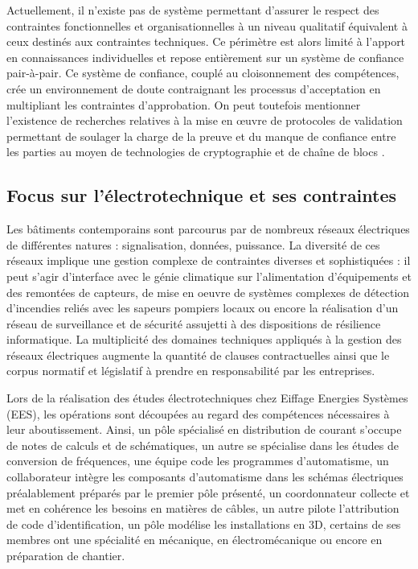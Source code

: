 \documentclass[a4paper,12pt]{article}
\begin{document}
Actuellement, il n'existe pas de système permettant d’assurer le respect des contraintes fonctionnelles et organisationnelles à un niveau qualitatif équivalent à ceux destinés aux contraintes techniques. Ce périmètre est alors limité à l'apport en connaissances individuelles et repose entièrement sur un système de confiance pair-à-pair. Ce système de confiance, couplé au cloisonnement des compétences, crée un environnement de doute contraignant les processus d'acceptation en multipliant les contraintes d’approbation. On peut toutefois mentionner l’existence de recherches relatives à la mise en œuvre de protocoles de validation permettant de soulager la charge de la preuve et du manque de confiance entre les parties au moyen de technologies de cryptographie et de chaîne de blocs \autocite{mathewsBIM+BlockchainSolutionTrust2017a}. 
\subsection{Focus sur l’électrotechnique et ses contraintes}
\label{sec:orgae91d64}
Les bâtiments contemporains sont parcourus par de nombreux réseaux électriques de différentes natures : signalisation, données, puissance. La diversité de ces réseaux implique une gestion complexe de contraintes diverses et sophistiquées : il peut s'agir d'interface avec le génie climatique sur l'alimentation d'équipements et des remontées de capteurs, de mise en oeuvre de systèmes complexes de détection d'incendies reliés avec les sapeurs pompiers locaux ou encore la réalisation d'un réseau de surveillance et de sécurité assujetti à des dispositions de résilience informatique. La multiplicité des domaines techniques appliqués à la gestion des réseaux électriques augmente la quantité de clauses contractuelles ainsi que le corpus normatif et législatif à prendre en responsabilité par les entreprises. 

Lors de la réalisation des études électrotechniques chez Eiffage Energies Systèmes (EES), les opérations sont découpées au regard des compétences nécessaires à leur aboutissement. Ainsi, un pôle spécialisé en distribution de courant s’occupe de notes de calculs et de schématiques, un autre se spécialise dans les études de conversion de fréquences, une équipe code les programmes d’automatisme, un collaborateur intègre les composants d’automatisme dans les schémas électriques préalablement préparés par le premier pôle présenté, un coordonnateur collecte et met en cohérence les besoins en matières de câbles, un autre pilote l’attribution de code d’identification, un pôle modélise les installations en 3D, certains de ses membres ont une spécialité en mécanique, en électromécanique ou encore en préparation de chantier. 
\end{document}
